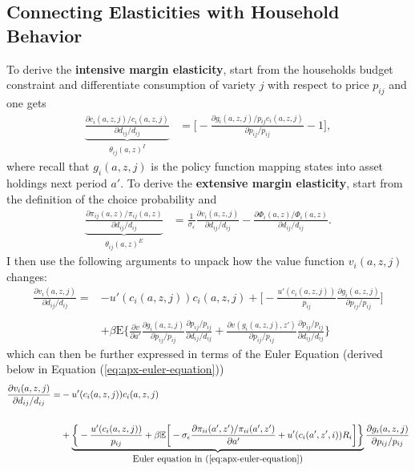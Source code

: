 \documentclass[12pt,pdftex]{article}
\begin{document}
\begin{onehalfspacing}
\subsection{Connecting Elasticities with Household Behavior}

To derive the \textbf{intensive margin elasticity}, start from the households budget constraint and differentiate consumption of variety $j$ with respect to price $p_{ij}$ and one gets
\begin{align}
\underbrace{\frac{\partial c_{i}(a,z,j)/ c_{i}(a,z,j)}{\partial d_{ij} / d_{ij}}}_{\theta_{ij}(a,z)^{I}} &= \bigg [-\frac{\partial g_{i}(a,z,j)/ p_{ij}c_{i}(a,z,j)}{\partial p_{ij}/ p_{ij}} - 1 \bigg ],
\label{eq:apx-intensive-margin}
\end{align}
where recall that $g_{i}(a,z,j)$ is the policy function mapping states into asset holdings next period $a'$. To derive the \textbf{extensive margin elasticity}, start from the definition of the choice probability and
\begin{align}
\underbrace{ \frac{\partial \pi_{ij}(a,z) / \pi_{ij}(a,z)}{\partial d_{ij} / d_{ij}} }_{\theta_{ij}(a,z)^{E}} &= \frac{1}{\sigma_{\epsilon}}\frac{\partial v_{i}(a, z, j)}{\partial d_{ij}/d_{ij}} -  \frac{\partial \Phi_{i}(a,z) / \Phi_{i}(a,z)}{\partial d_{ij}/d_{ij}}.
\label{eq:apx-extensive-margin}
\end{align}
I then use the following arguments to unpack how the value function $v_{i}(a, z, j)$ changes:
\begin{align}
\frac{\partial v_{i}(a,z,j)}{\partial d_{ij}/d_{ij}}  =& -u'(c_{i}(a,z,j))c_{i}(a,z,j) + \bigg [ -\frac{u'(c_{i}(a,z,j))}{p_{ij}}\frac{\partial g_{i}(a,z,j)}{\partial p_{ij}/ p_{ij}} \bigg ]  \\
\nonumber \\
&+ \beta \mathrm{E} \bigg \{\frac{\partial v}{\partial a'}\frac{\partial g_{i}(a,z,j)}{\partial p_{ij}/ p_{ij}}\frac{ \partial p_{ij}/ p_{ij}}{\partial d_{ij}/ d_{ij}} +  \frac{\partial v(g_{i}(a,z,j),z')}{\partial p_{ij}/ p_{ij}}\frac{ \partial p_{ij}/ p_{ij}}{\partial d_{ij}/ d_{ij}} \bigg \}
\end{align}
which can then be further expressed in terms of the Euler Equation (derived below in Equation (\ref{eq:apx-euler-equation}))
{\small
\begin{align}
\frac{\partial v_{i}(a,z,j)}{\partial d_{ij}/d_{ij}}  =& -u'(c_{i}(a,z,j))c_{i}(a,z,j) \label{eq:apx-first-term}\\
\nonumber \\
&+ \underbrace{\bigg \{ -\frac{u'(c_{i}(a,z,j))}{p_{ij}} + \beta \mathbb{E} \bigg [ -\sigma_{\epsilon} \frac{\partial \pi_{ii}(a',z') / \pi_{ii}(a',z')}{\partial a'} + u'(c_{i}(a',z',i))R_{i} \bigg ] \bigg \} }_{\mbox{Euler equation in (\ref{eq:apx-euler-equation})}} \frac{\partial g_{i}(a,z,j)}{\partial p_{ij}/ p_{ij}} \\

\end{align}}
\end{onehalfspacing}
\end{document}
